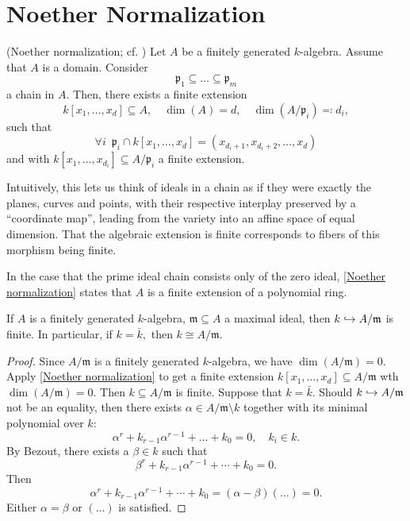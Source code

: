 \section{Noether Normalization}

\begin{theorem}(Noether normalization; cf. \cite[\S 13]{eisenbud1995commutative})
  \label{Noether normalization}
  Let \(A\) be a finitely generated \(k\)-algebra. Assume that \(A\) is a domain.
  Consider
  \[\mathfrak p_1 \subseteq \dotsc \subseteq \mathfrak p_m\]
  a chain in \(A.\)
  Then, there exists a finite extension
  \[k[x_1, \dotsc, x_d] \subseteq A, \quad \dim(A) = d, \quad \dim(A/{\mathfrak p_i}) \eqqcolon d_i,\]
  such that
  \[\forall i \enspace \mathfrak p_i \cap k[x_1, \dotsc, x_d] = (x_{d_i+1}, x_{d_i+2}, \dotsc, x_d)\]
  and with
  \(k[x_1, \dotsc, x_{d_i}] \subseteq A/{\mathfrak p_i}\)
  a finite extension.
\end{theorem}

Intuitively, this lets us think of ideals in a chain as if they were exactly the planes, curves and points, with their respective interplay preserved by a ``coordinate map'', leading from the variety into an affine space of equal dimension. That the algebraic extension is finite corresponds to fibers of this morphism being finite.

\begin{note}
  In the case that the prime ideal chain consists only of the zero ideal, \cref{Noether normalization} states that \(A\) is a finite extension of a polynomial ring.
\end{note}


\begin{theorem}
  \label{weak Nullstellensatz}
  If \(A\) is a finitely generated \(k\)-algebra, \(\mathfrak m \subseteq A\) a maximal ideal, then
  \(k \hookrightarrow A/{\mathfrak m}\)
  is finite.
  In particular, if \(k = \bar k,\) then \(k \cong A/{\mathfrak m}.\)
\end{theorem}
\begin{proof}
  Since \(A/{\mathfrak m}\) is a finitely generated \(k\)-algebra, we have
  \(\dim(A/{\mathfrak m}) = 0.\)
  Apply \cref{Noether normalization} to get a finite extension
  \(k[x_1, \dotsc, x_d] \subseteq A/{\mathfrak m}\)
  wth \(\dim(A/{\mathfrak m}) = 0.\)
  Then
  \(k \subseteq A/{\mathfrak m}\)
  is finite.
  Suppose that \(k = \bar k.\) Should \(k \hookrightarrow A/{\mathfrak m}\) not be an equality, then there exists
  \(\alpha \in A/{\mathfrak m} \setminus k\)
  together with its minimal polynomial over \(k:\)
  \[\alpha^r + k_{r-1} \alpha^{r-1} + \dotsc + k_0 = 0, \quad k_i \in k.\]
  By Bezout, there exists a \(\beta \in k\) such that
  \[\beta^r + k_{r-1} \alpha^{r-1} + \dotsb + k_0 = 0.\]
  Then
  \[ \alpha^r + k_{r-1} \alpha^{r-1} + \dotsb + k_0 = (\alpha - \beta)(\dotso) = 0.\]
  Either \(\alpha = \beta\) or \((\dotso)\) is satisfied.
\end{proof}


